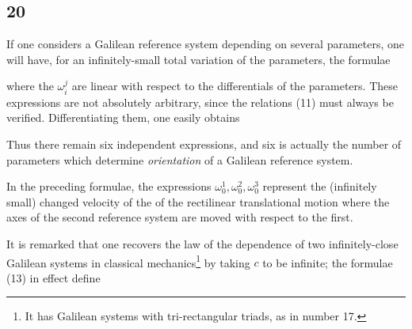 \subsection*{20}
If one considers a Galilean reference system depending on several parameters, one will have, for an infinitely-small total variation of the parameters, the formulae


where the $\omega_i^j$ are linear with respect to the differentials of the parameters. These expressions are not absolutely arbitrary, since the relations (11) must always be verified. Differentiating them, one easily obtains


Thus there remain six independent expressions, and six is actually the number of parameters which determine \textit{orientation} of a Galilean reference system.

In the preceding formulae, the expressions $\omega_0^1, \omega_0^2, \omega_0^3$ represent the (infinitely small) changed velocity of the  of the rectilinear translational motion where the axes of the second reference system are moved with respect to the first.

It is remarked that one recovers the law of the dependence of two infinitely-close Galilean systems in classical mechanics\footnote{It has Galilean systems with tri-rectangular triads, as in number 17.} by taking $c$ to be infinite; the formulae (13) in effect define

